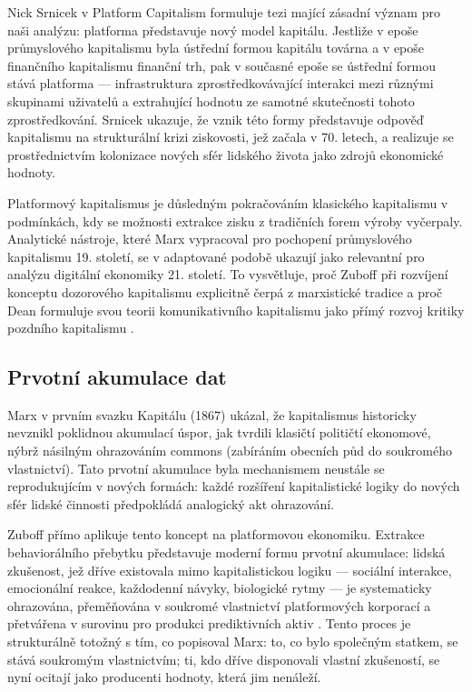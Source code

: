 Nick Srnicek v Platform Capitalism \parencite{Srnicek17} formuluje tezi mající zásadní význam pro naši analýzu: platforma představuje nový model kapitálu.
Jestliže v epoše průmyslového kapitalismu byla ústřední formou kapitálu továrna a v epoše finančního kapitalismu finanční trh, pak v současné epoše se ústřední formou stává platforma — infrastruktura zprostředkovávající interakci mezi různými skupinami uživatelů a extrahující hodnotu ze samotné skutečnosti tohoto zprostředkování. Srnicek ukazuje, že vznik této formy představuje odpověď kapitalismu na strukturální krizi ziskovosti, jež začala v 70. letech, a realizuje se prostřednictvím kolonizace nových sfér lidského života jako zdrojů ekonomické hodnoty.

Platformový kapitalismus je důsledným pokračováním klasického kapitalismu v podmínkách, kdy se možnosti extrakce zisku z tradičních forem výroby vyčerpaly. Analytické nástroje, které Marx vypracoval pro pochopení průmyslového kapitalismu 19. století, se v adaptované podobě ukazují jako relevantní pro analýzu digitální ekonomiky 21. století. To vysvětluje, proč Zuboff při rozvíjení konceptu dozorového kapitalismu explicitně čerpá z marxistické tradice a proč Dean formuluje svou teorii komunikativního kapitalismu jako přímý rozvoj kritiky pozdního kapitalismu \parencite{Zuboff19,Dean09}.

\subsection{Prvotní akumulace dat}

Marx v prvním svazku Kapitálu (1867) \parencite{Marx67} ukázal, že kapitalismus historicky nevznikl poklidnou akumulací úspor, jak tvrdili klasičtí političtí ekonomové, nýbrž násilným ohrazováním commons (zabíráním obecních půd do soukromého vlastnictví). Tato prvotní akumulace byla mechanismem neustále se reprodukujícím v nových formách: každé rozšíření kapitalistické logiky do nových sfér lidské činnosti předpokládá analogický akt ohrazování.

Zuboff přímo aplikuje tento koncept na platformovou ekonomiku. Extrakce behaviorálního přebytku představuje moderní formu prvotní akumulace: lidská zkušenost, jež dříve existovala mimo kapitalistickou logiku — sociální interakce, emocionální reakce, každodenní návyky, biologické rytmy — je systematicky ohrazována, přeměňována v soukromé vlastnictví platformových korporací a přetvářena v surovinu pro produkci prediktivních aktiv \parencite{Zuboff19}. Tento proces je strukturálně totožný s tím, co popisoval Marx: to, co bylo společným statkem, se stává soukromým vlastnictvím; ti, kdo dříve disponovali vlastní zkušeností, se nyní ocitají jako producenti hodnoty, která jim nenáleží.

